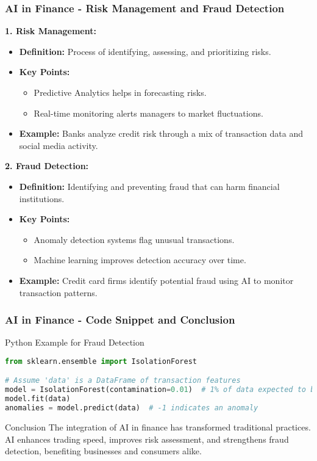 \documentclass{beamer}
\begin{document}
\begin{frame}[fragile]
    \frametitle{AI in Finance - Risk Management and Fraud Detection}

    \textbf{1. Risk Management:}
    \begin{itemize}
        \item \textbf{Definition:} Process of identifying, assessing, and prioritizing risks.
        \item \textbf{Key Points:}
        \begin{itemize}
            \item Predictive Analytics helps in forecasting risks.
            \item Real-time monitoring alerts managers to market fluctuations.
        \end{itemize}
        \item \textbf{Example:} Banks analyze credit risk through a mix of transaction data and social media activity.
    \end{itemize}

    \vspace{0.5cm}
    
    \textbf{2. Fraud Detection:}
    \begin{itemize}
        \item \textbf{Definition:} Identifying and preventing fraud that can harm financial institutions.
        \item \textbf{Key Points:}
        \begin{itemize}
            \item Anomaly detection systems flag unusual transactions.
            \item Machine learning improves detection accuracy over time.
        \end{itemize}
        \item \textbf{Example:} Credit card firms identify potential fraud using AI to monitor transaction patterns.
    \end{itemize}
\end{frame}

\begin{frame}[fragile]
    \frametitle{AI in Finance - Code Snippet and Conclusion}
    \begin{block}{Python Example for Fraud Detection}
        \begin{lstlisting}[language=Python]
from sklearn.ensemble import IsolationForest

# Assume 'data' is a DataFrame of transaction features
model = IsolationForest(contamination=0.01)  # 1% of data expected to be anomalies
model.fit(data)
anomalies = model.predict(data)  # -1 indicates an anomaly
        \end{lstlisting}
    \end{block}

    \begin{block}{Conclusion}
        The integration of AI in finance has transformed traditional practices. AI enhances trading speed, improves risk assessment, and strengthens fraud detection, benefiting businesses and consumers alike.
    \end{block}
\end{frame}
\end{document}
